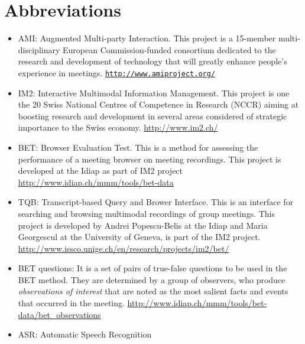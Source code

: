 \newpage
\chapter*{Abbreviations}   

\begin{itemize}

\item {AMI: Augmented Multi-party Interaction. This project is a 15-member multi-disciplinary European Commission-funded consortium dedicated to the research and development of technology that will greatly enhance people’s experience in meetings. \href{http://www.amiproject.org/}{\texttt{http://www.amiproject.org/}}}

\item {IM2: Interactive Multimodal Information Management. This project is one the 20 Swiss National Centres of Competence in Research (NCCR) aiming at boosting research and development in several areas considered of strategic importance to the Swiss economy. \url{http://www.im2.ch/}}

\item {BET: Browser Evaluation Test. This is a method for assessing the performance of a meeting browser on meeting recordings. This project is developed at the Idiap as part of IM2 project \url{http://www.idiap.ch/mmm/tools/bet-data}}

\item {TQB: Transcript-based Query and Brower Interface. This is an interface for searching and browsing multimodal recordings of group meetings. This project is developed by Andrei Popescu-Belis at the Idiap and Maria Georgescul at the University of Geneva, is part of the IM2 project. \url{http://www.issco.unige.ch/en/research/projects/im2/bet/}}

\item {BET questions: It is a set of pairs of true-false questions to be used in the BET method. They are determined by a group of observers, who produce \textit{observations of interest} that are noted as the most salient facts and events that occurred in the meeting. \url{http://www.idiap.ch/mmm/tools/bet-data/bet_observations}}

\item {ASR: Automatic Speech Recognition}


\end{itemize}
